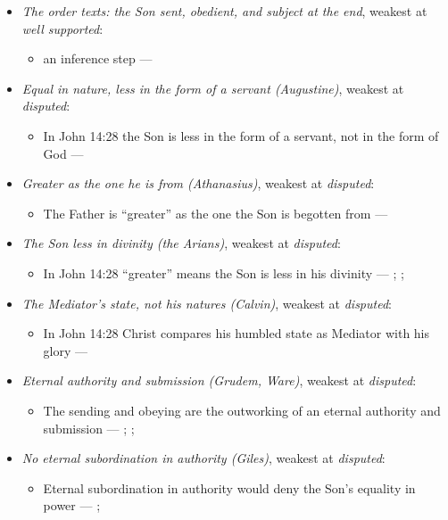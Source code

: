 \documentclass[11pt,paper=\testimonypaper,DIV=13,parskip=false]{scrartcl}
\begin{document}
\begin{itemize}
\item \emph{The order texts: the Son sent, obedient, and subject at the end}, weakest at \emph{well supported}:
\begin{itemize}
\item an inference step --- \cite[3, The Triune God]{kibbey-living-systematic-theology-2026}
\end{itemize}
\item \emph{Equal in nature, less in the form of a servant (Augustine)}, weakest at \emph{disputed}:
\begin{itemize}
\item In John 14:28 the Son is less in the form of a servant, not in the form of God --- \cite[On the Trinity I.7.14]{schaff-nicene-post-nicene-fathers-1-3-1887}
\end{itemize}
\item \emph{Greater as the one he is from (Athanasius)}, weakest at \emph{disputed}:
\begin{itemize}
\item The Father is “greater” as the one the Son is begotten from --- \cite[Against the Arians I.13.58]{schaff-nicene-post-nicene-fathers-2-4-1892}
\end{itemize}
\item \emph{The Son less in divinity (the Arians)}, weakest at \emph{disputed}:
\begin{itemize}
\item In John 14:28 “greater” means the Son is less in his divinity --- \cite[De Synodis 28]{schaff-nicene-post-nicene-fathers-2-4-1892}; \cite[On the Trinity I.7.14]{schaff-nicene-post-nicene-fathers-1-3-1887}; \cite[102]{calvin-commentary-john-2-1847}
\end{itemize}
\item \emph{The Mediator’s state, not his natures (Calvin)}, weakest at \emph{disputed}:
\begin{itemize}
\item In John 14:28 Christ compares his humbled state as Mediator with his glory --- \cite[102--103]{calvin-commentary-john-2-1847}
\end{itemize}
\item \emph{Eternal authority and submission (Grudem, Ware)}, weakest at \emph{disputed}:
\begin{itemize}
\item The sending and obeying are the outworking of an eternal authority and submission --- \cite[40]{grudem-doctrinal-deviations-2015}; \cite{grudem-ets-trinity-2016}; \cite{ware-father-son-holy-spirit-2005}
\end{itemize}
\item \emph{No eternal subordination in authority (Giles)}, weakest at \emph{disputed}:
\begin{itemize}
\item Eternal subordination in authority would deny the Son’s equality in power --- \cite[323]{giles-ets-trinity-2008}; \cite{giles-jesus-and-the-father-2006}
\end{itemize}
\end{itemize}
\end{document}
